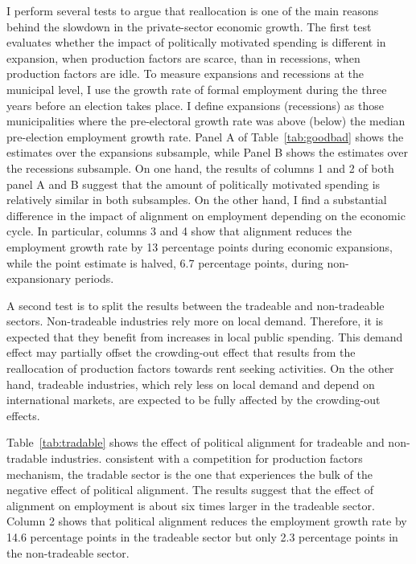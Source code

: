 \documentclass[dv_diss_main.tex]{subfiles}
\begin{document}
I perform several tests to argue that reallocation is one of the main reasons behind the slowdown in the private-sector economic growth. The first test evaluates whether the impact of politically motivated spending is different in expansion, when production factors are scarce, than in recessions, when production factors are idle. To measure expansions and recessions at the municipal level, I use the growth rate of formal employment during the three years before an election takes place. I define expansions (recessions) as those municipalities where the pre-electoral growth rate was above (below) the median pre-election employment growth rate.  Panel A of Table~\ref{tab:goodbad} shows the estimates over the expansions subsample, while Panel B shows the estimates over the recessions subsample. On one hand, the results of columns 1 and 2 of both panel A and B suggest that the amount of politically motivated spending is relatively similar in both subsamples. On the other hand, I find a substantial difference in the impact of alignment on employment depending on the economic cycle. In particular, columns 3 and 4 show that alignment reduces the employment growth rate by 13 percentage points during economic expansions, while the point estimate is halved, 6.7 percentage points, during  non-expansionary periods.  

A second test is to split the results between the tradeable and non-tradeable sectors.  Non-tradeable industries rely more on local demand. Therefore, it is expected that they benefit from increases in local public spending. This demand effect may partially offset the crowding-out effect that results from the reallocation of production factors towards rent seeking activities. On the other hand, tradeable industries, which rely less on local demand and depend on international markets, are expected to be fully affected by the crowding-out effects. 

Table~\ref{tab:tradable}  shows the effect of political alignment for tradeable and non-tradable industries. consistent with a competition for production factors mechanism, the tradable sector is the one that experiences the bulk of the negative effect of political alignment. The results suggest that the effect of alignment on employment is about six times larger in the tradeable sector. Column 2 shows that political alignment reduces the employment growth rate by 14.6 percentage points in the tradeable sector but only 2.3 percentage points in the non-tradeable sector.
\end{document}
